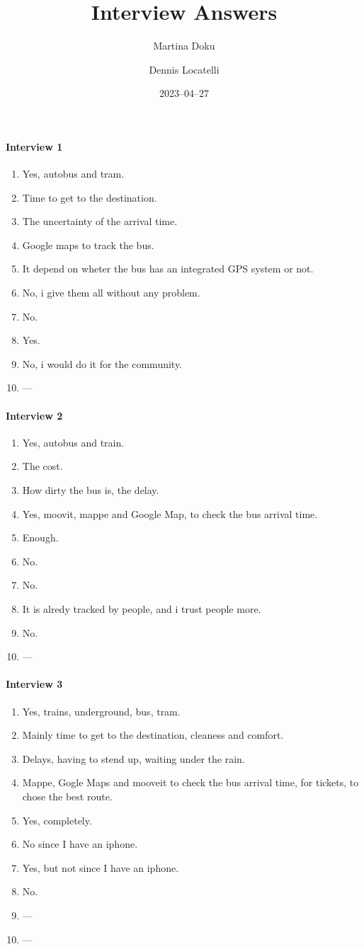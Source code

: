 \documentclass[a4paper, 11pt, twocolumn]{article}
\title{Interview Answers}
\author{Martina Doku \and Dennis Locatelli}
\date{2023--04--27}
\begin{document}
\maketitle
\paragraph*{Interview 1}\begin{enumerate}
	\item Yes, autobus and tram.
	\item Time to get to the destination.
	\item The uncertainty of the arrival time.
	\item Google maps to track the bus.
	\item It depend on wheter the bus has an integrated GPS system or not.
	\item No, i give them all without any problem.
	\item No.
	\item Yes.
	\item No, i would do it for the community.
	\item ---
\end{enumerate}

\paragraph*{Interview 2}\begin{enumerate}
	\item Yes, autobus and train.
	\item The cost.
	\item How dirty the bus is, the delay.
	\item Yes, moovit, mappe and Google Map, to check the bus arrival time.
	\item Enough.
	\item No.
	\item No.
	\item It is alredy tracked by people, and i trust people more.
	\item No.
	\item ---
\end{enumerate}
\paragraph*{Interview 3}\begin{enumerate}
	\item Yes, trains, underground, bus, tram.
	\item Mainly time to get to the destination, cleaness and comfort.
	\item Delays, having to stend up, waiting under the rain.
	\item Mappe, Gogle Maps and mooveit to check the bus arrival time,
	      for tickets, to chose the best route.
	\item Yes, completely.
	\item No since I have an iphone.
	\item Yes, but not since I have an iphone.
	\item No.
	\item ---
	\item ---
\end{enumerate}
\end{document}
